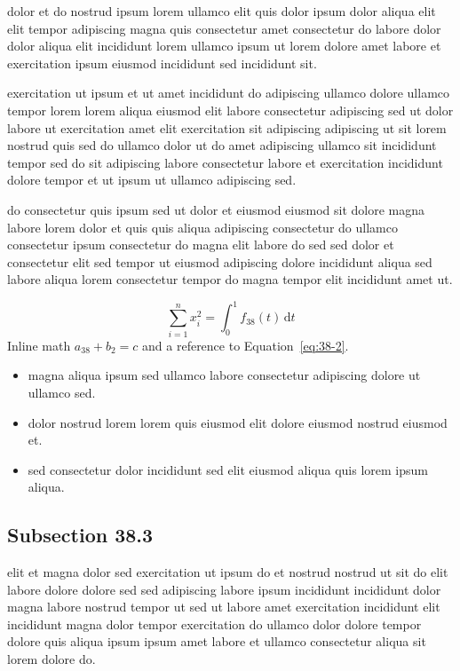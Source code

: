 \documentclass{article}
\begin{document}
dolor et do nostrud ipsum lorem ullamco elit quis dolor ipsum dolor aliqua elit elit tempor adipiscing magna quis consectetur amet consectetur do labore dolor dolor aliqua elit incididunt lorem ullamco ipsum ut lorem dolore amet labore et exercitation ipsum eiusmod incididunt sed incididunt sit.

exercitation ut ipsum et ut amet incididunt do adipiscing ullamco dolore ullamco tempor lorem lorem aliqua eiusmod elit labore consectetur adipiscing sed ut dolor labore ut exercitation amet elit exercitation sit adipiscing adipiscing ut sit lorem nostrud quis sed do ullamco dolor ut do amet adipiscing ullamco sit incididunt tempor sed do sit adipiscing labore consectetur labore et exercitation incididunt dolore tempor et ut ipsum ut ullamco adipiscing sed.

do consectetur quis ipsum sed ut dolor et eiusmod eiusmod sit dolore magna labore lorem dolor et quis quis aliqua adipiscing consectetur do ullamco consectetur ipsum consectetur do magna elit labore do sed sed dolor et consectetur elit sed tempor ut eiusmod adipiscing dolore incididunt aliqua sed labore aliqua lorem consectetur tempor do magna tempor elit incididunt amet ut.

\begin{equation}\label{eq:38-2}
  \sum_{i=1}^{n} x_i^{2} = \int_0^1 f_{38}(t)\,\mathrm{d}t
\end{equation}
Inline math $a_{38} + b_{2} = c$ and a reference to Equation~\eqref{eq:38-2}.

\begin{itemize}
  \item magna aliqua ipsum sed ullamco labore consectetur adipiscing dolore ut ullamco sed.
  \item dolor nostrud lorem lorem quis eiusmod elit dolore eiusmod nostrud eiusmod et.
  \item sed consectetur dolor incididunt sed elit eiusmod aliqua quis lorem ipsum aliqua.
\end{itemize}

\subsection{Subsection 38.3}\label{sec:38-3}
elit et magna dolor sed exercitation ut ipsum do et nostrud nostrud ut sit do elit labore dolore dolore sed sed adipiscing labore ipsum incididunt incididunt dolor magna labore nostrud tempor ut sed ut labore amet exercitation incididunt elit incididunt magna dolor tempor exercitation do ullamco dolor dolore tempor dolore quis aliqua ipsum ipsum amet labore et ullamco consectetur aliqua sit lorem dolore do.
\end{document}

